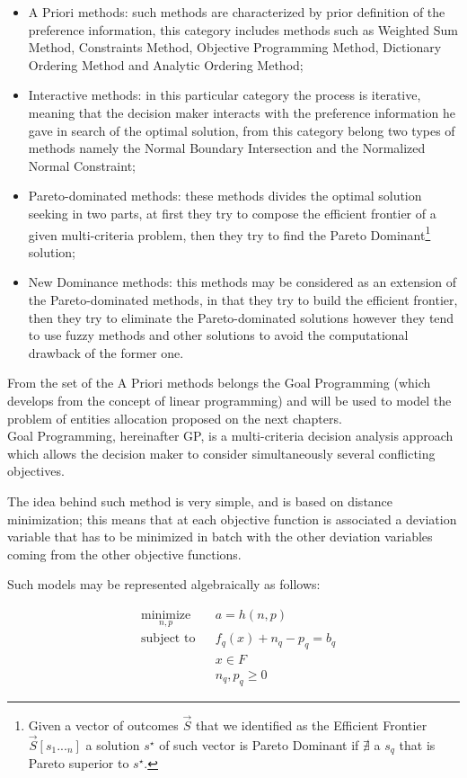 \begin{doublespace}
\begin{itemize}
	\item A Priori methods: such methods are characterized by prior definition of the preference information, this category includes methods such as Weighted Sum Method, Constraints Method, Objective Programming Method, Dictionary Ordering Method and Analytic Ordering Method;   
	\item Interactive methods: in this particular category the process is iterative, meaning that the decision maker interacts with the preference information he gave in search of the optimal solution, from this category belong two types of methods namely the Normal Boundary Intersection and the Normalized Normal Constraint;
	\item Pareto-dominated methods: these methods divides the optimal solution seeking in two parts, at first they try to compose the efficient frontier of a given multi-criteria problem, then they try to find the Pareto Dominant\footnote{Given a vector of outcomes $\vec{S}$ that we identified as the Efficient Frontier $\vec{S}[s_1..._n]$ a solution $s^{\star}$ of such vector is Pareto Dominant if $\nexists$ a $s_q$ that is Pareto superior to $s^{\star}$.} solution;
	\item New Dominance methods: this methods may be considered as an extension of the Pareto-dominated methods, in that they try to build the efficient frontier, then they try to eliminate the Pareto-dominated solutions however they tend to use fuzzy methods and other solutions to avoid the computational drawback of the former one.  
\end{itemize}

From the set of the A Priori methods belongs the Goal Programming (which develops from the concept of linear programming) and will be used to model the problem of entities allocation proposed on the next chapters.
\\
Goal Programming, hereinafter GP, is a multi-criteria decision analysis approach which allows the decision maker to consider simultaneously several conflicting objectives.

The idea behind such method is very simple, and is based on distance minimization; this means that at each objective function is associated a deviation variable that has to be minimized in batch with the other deviation variables coming from the other objective functions.

Such models may be represented algebraically as follows:

\begin{equation*}
\begin{aligned}
& \underset{n,p}{\text{minimize}}
& & a=h(n,p) \\
& \text{subject to}
& & f_q(x)+n_q-p_q=b_q \\
& & & x\in F \\
& & & n_q,p_q\geq 0 
\end{aligned}
\end{equation*}


\end{doublespace}
